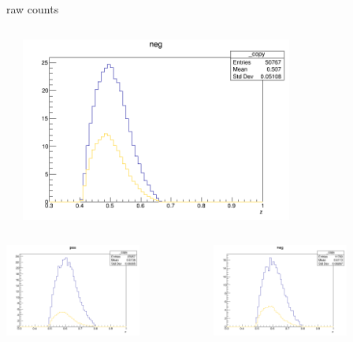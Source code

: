 \begin{frame}{raw counts}
\begin{columns}
\begin{column}[T]{0.25\textwidth}
\end{column}
\begin{column}[T]{0.25\textwidth}
\includegraphics[width = 0.7\textwidth]{results/yield/statistics/yield_x_Q2_z_0.45_3.898_0.50_neg.png}
\end{column}
\end{columns}
\begin{columns}
\begin{column}[T]{0.25\textwidth}
\includegraphics[width = 0.7\textwidth]{results/yield/statistics/yield_x_Q2_z_0.45_3.898_0.60_pos.png}
\end{column}
\begin{column}[T]{0.25\textwidth}
\includegraphics[width = 0.7\textwidth]{results/yield/statistics/yield_x_Q2_z_0.45_3.898_0.60_neg.png}

\end{column}
\end{columns}
\end{frame}

